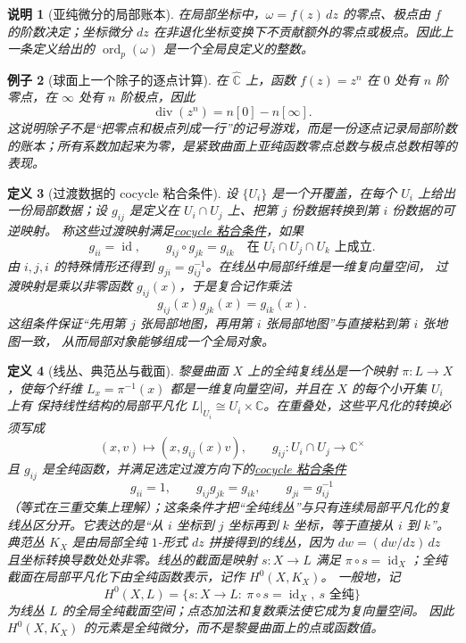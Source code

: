 \documentclass[UTF8,fontset=none,a4paper,11pt]{ctexart}
\theoremstyle{foundation-definition}
\newtheorem{definition}{定义}[section]
\theoremstyle{foundation-theorem}
\theoremstyle{foundation-proposition}
\theoremstyle{foundation-example}
\newtheorem{example}[definition]{例子}
\theoremstyle{foundation-remark}
\newtheorem{remark}[definition]{说明}
\theoremstyle{foundation-theorem}
\newcommand{\C}{\mathbb C}
\newcommand{\term}[2]{\hyperref[#1]{#2}}
\begin{document}
\begin{remark}[亚纯微分的局部账本]
在局部坐标中，\(\omega=f(z)\,dz\) 的零点、极点由 \(f\) 的阶数决定；坐标微分
\(dz\) 在非退化坐标变换下不贡献额外的零点或极点。因此上一条定义给出的
\(\operatorname{ord}_p(\omega)\) 是一个全局良定义的整数。
\end{remark}

\begin{example}[球面上一个除子的逐点计算]
在 \(\widehat{\mathbb C}\) 上，函数 \(f(z)=z^n\) 在 \(0\) 处有 \(n\) 阶零点，在 \(\infty\) 处有 \(n\) 阶极点，因此
\[
\operatorname{div}(z^n)=n[0]-n[\infty].
\]
这说明除子不是“把零点和极点列成一行”的记号游戏，而是一份逐点记录局部阶数的账本；所有系数加起来为零，是紧致曲面上亚纯函数零点总数与极点总数相等的表现。
\end{example}

\begin{definition}[过渡数据的 cocycle 粘合条件]\label{def:cocycle-condition}
设 \(\{U_i\}\) 是一个开覆盖，在每个 \(U_i\) 上给出一份局部数据；设
\(g_{ij}\) 是定义在 \(U_i\cap U_j\) 上、把第 \(j\) 份数据转换到第 \(i\) 份数据的可逆映射。
称这些过渡映射满足\term{def:cocycle-condition}{cocycle 粘合条件}，如果
\[
g_{ii}=\operatorname{id},\qquad
g_{ij}\circ g_{jk}=g_{ik}
\quad\text{在 }U_i\cap U_j\cap U_k\text{ 上成立}.
\]
由 \(i,j,i\) 的特殊情形还得到 \(g_{ji}=g_{ij}^{-1}\)。在线丛中局部纤维是一维复向量空间，
过渡映射是乘以非零函数 \(g_{ij}(x)\)，于是复合记作乘法
\[
g_{ij}(x)g_{jk}(x)=g_{ik}(x).
\]
这组条件保证“先用第 \(j\) 张局部地图，再用第 \(i\) 张局部地图”与直接粘到第 \(i\) 张地图一致，
从而局部对象能够组成一个全局对象。
\end{definition}

\begin{definition}[线丛、典范丛与截面]\label{def:line-bundle}
黎曼曲面 \(X\) 上的全纯复线丛是一个映射 \(\pi:L\to X\)，使每个纤维
\(L_x=\pi^{-1}(x)\) 都是一维复向量空间，并且在 \(X\) 的每个小开集 \(U_i\) 上有
保持线性结构的局部平凡化 \(L|_{U_i}\cong U_i\times\C\)。在重叠处，这些平凡化的转换必须写成
\[
(x,v)\longmapsto(x,g_{ij}(x)v),\qquad
g_{ij}:U_i\cap U_j\to\C^\times
\]
且 \(g_{ij}\) 是全纯函数，并满足选定过渡方向下的\term{def:cocycle-condition}{cocycle 粘合条件}
\[
g_{ii}=1,\qquad g_{ij}g_{jk}=g_{ik},\qquad g_{ji}=g_{ij}^{-1}
\]
（等式在三重交集上理解）；这条条件才把“全纯线丛”与只有连续局部平凡化的复线丛区分开。它表达的是“从 \(i\) 坐标到 \(j\) 坐标再到 \(k\) 坐标，等于直接从 \(i\) 到 \(k\)”。
典范丛 \(K_X\) 是由局部全纯 \(1\)-形式 \(dz\) 拼接得到的线丛，因为
\(dw=(dw/dz)\,dz\) 且坐标转换导数处处非零。线丛的截面是映射
\(s:X\to L\) 满足 \(\pi\circ s=\operatorname{id}_X\)；全纯截面在局部平凡化下由全纯函数表示，记作 \(H^0(X,K_X)\)。
一般地，记
\[
H^0(X,L)=\{s:X\to L:\ \pi\circ s=\operatorname{id}_X,\ s\text{ 全纯}\}
\]
为线丛 \(L\) 的全局全纯截面空间；点态加法和复数乘法使它成为复向量空间。
因此 \(H^0(X,K_X)\) 的元素是全纯微分，而不是黎曼曲面上的点或函数值。
\end{definition}
\end{document}
